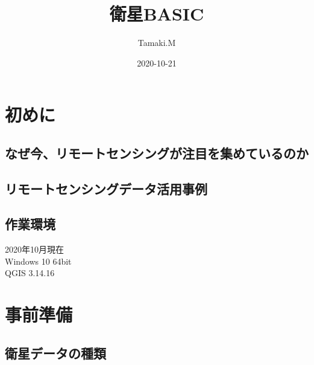 \documentclass[
]{book}
\title{衛星BASIC}
\author{Tamaki.M}
\date{2020-10-21}
\begin{document}
\maketitle

{
\setcounter{tocdepth}{1}
\tableofcontents
}
\hypertarget{ux521dux3081ux306b}{%
\chapter*{初めに}\label{ux521dux3081ux306b}}

\hypertarget{ux306aux305cux4ecaux30eaux30e2ux30fcux30c8ux30bbux30f3ux30b7ux30f3ux30b0ux304cux6ce8ux76eeux3092ux96c6ux3081ux3066ux3044ux308bux306eux304b}{%
\section{なぜ今、リモートセンシングが注目を集めているのか}\label{ux306aux305cux4ecaux30eaux30e2ux30fcux30c8ux30bbux30f3ux30b7ux30f3ux30b0ux304cux6ce8ux76eeux3092ux96c6ux3081ux3066ux3044ux308bux306eux304b}}

\hypertarget{ux30eaux30e2ux30fcux30c8ux30bbux30f3ux30b7ux30f3ux30b0ux30c7ux30fcux30bfux6d3bux7528ux4e8bux4f8b}{%
\section{リモートセンシングデータ活用事例}\label{ux30eaux30e2ux30fcux30c8ux30bbux30f3ux30b7ux30f3ux30b0ux30c7ux30fcux30bfux6d3bux7528ux4e8bux4f8b}}

\hypertarget{ux4f5cux696dux74b0ux5883}{%
\section{作業環境}\label{ux4f5cux696dux74b0ux5883}}

2020年10月現在\\
Windows 10 64bit\\
QGIS 3.14.16

\hypertarget{ux4e8bux524dux6e96ux5099}{%
\chapter{事前準備}\label{ux4e8bux524dux6e96ux5099}}

\hypertarget{ux885bux661fux30c7ux30fcux30bfux306eux7a2eux985e}{%
\section{衛星データの種類}\label{ux885bux661fux30c7ux30fcux30bfux306eux7a2eux985e}}
\end{document}
